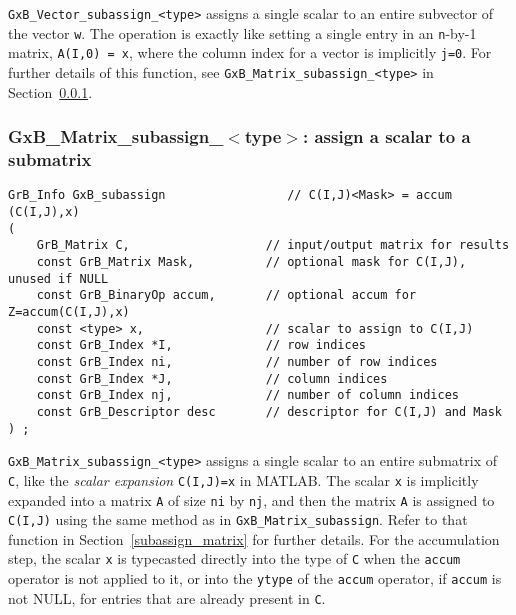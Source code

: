 \documentclass[12pt]{article}
\begin{document}
\verb'GxB_Vector_subassign_<type>' assigns a single scalar to an entire
subvector of the vector \verb'w'.  The operation is exactly like setting a
single entry in an \verb'n'-by-1 matrix, \verb'A(I,0) = x', where the column
index for a vector is implicitly \verb'j=0'.  For further details of this
function, see \verb'GxB_Matrix_subassign_<type>' in
Section~\ref{subassign_matrix_scalar}.

\newpage
\subsubsection{{\sf GxB\_Matrix\_subassign\_$<$type$>$:} assign a scalar to a submatrix}
\label{subassign_matrix_scalar}

\begin{mdframed}[userdefinedwidth=6in]
{\footnotesize
\begin{verbatim}
GrB_Info GxB_subassign                 // C(I,J)<Mask> = accum (C(I,J),x)
(
    GrB_Matrix C,                   // input/output matrix for results
    const GrB_Matrix Mask,          // optional mask for C(I,J), unused if NULL
    const GrB_BinaryOp accum,       // optional accum for Z=accum(C(I,J),x)
    const <type> x,                 // scalar to assign to C(I,J)
    const GrB_Index *I,             // row indices
    const GrB_Index ni,             // number of row indices
    const GrB_Index *J,             // column indices
    const GrB_Index nj,             // number of column indices
    const GrB_Descriptor desc       // descriptor for C(I,J) and Mask
) ;
\end{verbatim} } \end{mdframed}

\verb'GxB_Matrix_subassign_<type>' assigns a single scalar to an entire
submatrix of \verb'C', like the {\em scalar expansion} \verb'C(I,J)=x' in
MATLAB.  The scalar \verb'x' is implicitly expanded into a matrix \verb'A' of
size \verb'ni' by \verb'nj', and then the matrix \verb'A' is assigned to
\verb'C(I,J)' using the same method as in \verb'GxB_Matrix_subassign'.  Refer
to that function in Section~\ref{subassign_matrix} for further details.
For the accumulation step, the scalar \verb'x' is typecasted directly into the
type of \verb'C' when the \verb'accum' operator is not applied to it, or into
the \verb'ytype' of the \verb'accum' operator, if \verb'accum' is not NULL, for
entries that are already present in \verb'C'.
\end{document}
